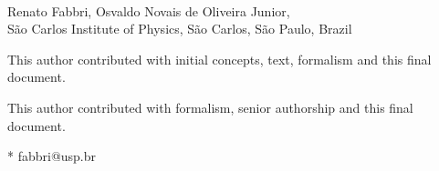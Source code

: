 \documentclass[10pt,letterpaper]{article}
\date{}
\begin{document}
\vspace*{0.2in}

\begin{flushleft}
{\Large
\textbf{} %
}
\newline
\\
Renato Fabbri\textsuperscript{\Yinyang*},
Osvaldo Novais de Oliveira Junior\textsuperscript{\ddag},
\\
\bigskip
São Carlos Institute of Physics, São Carlos, São Paulo, Brazil
\bigskip

% 
%
\Yinyang This author contributed with initial concepts, text, formalism and this final document.

\ddag This author contributed with formalism, senior authorship and this final document.




* fabbri@usp.br

\end{flushleft}
\end{document}
